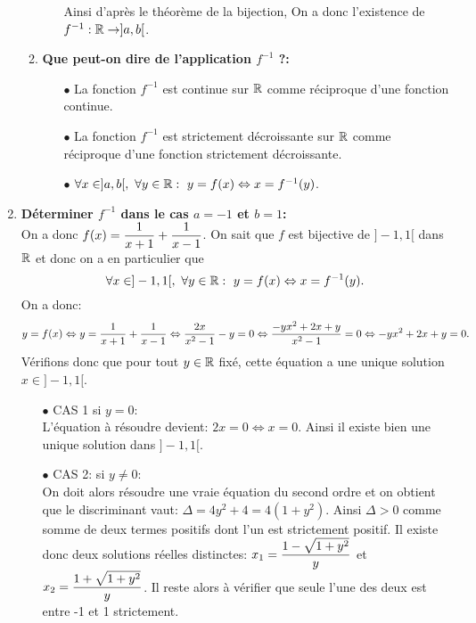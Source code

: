 \documentclass[a4paper, 11pt,reqno]{article}
\begin{document}
\begin{correction}
\begin{enumerate}
\begin{enumerate}
\begin{itemize}
\begin{itemize}
				                  \end{itemize}
				                  Ainsi d'apr\`{e}s le th\'eor\`{e}me de la bijection,  On a donc l'existence de $f^{-1}: \mathbb{R}\rightarrow \rbrack a,b\lbrack$.
			            \end{itemize}
			      \item  \textbf{Que peut-on dire de l'application $f^{-1}$ ?:}
			            \begin{itemize}
				            \item[$\bullet$] La fonction $f^{-1}$ est continue sur $\mathbb{R}$ comme r\'eciproque d'une fonction continue.
				            \item[$\bullet$] La fonction $f^{-1}$ est strictement d\'ecroissante sur $\mathbb{R}$ comme r\'eciproque d'une fonction strictement d\'ecroissante.
				            \item[$\bullet$] $\forall x\in\rbrack a,b\lbrack,\ \forall y\in\mathbb{R}:\ y=f(x)\Leftrightarrow x=f^{-1}(y)$.
			            \end{itemize}
		      \end{enumerate}
		\item \textbf{D\'eterminer $f^{-1}$ dans le cas $a=-1$ et $b=1$:}\\
		      \noindent On a donc $f(x)=\displaystyle\frac{1}{x+1}+\displaystyle\frac{1}{x-1}$. On sait que $f$ est bijective de $\rbrack -1,1\lbrack$ dans $\mathbb{R}$ et donc on a en particulier que
		      $$\forall x\in\rbrack -1,1\lbrack,\ \forall y\in\R:\ y=f(x)\Leftrightarrow x=f^{-1}(y).$$
		      On a donc:
		      $$y=f(x)\Leftrightarrow y=\displaystyle\frac{1}{x+1}+\displaystyle\frac{1}{x-1} \Leftrightarrow \displaystyle\frac{2x}{x^2-1}-y=0\Leftrightarrow \displaystyle\frac{-yx^2+2x+y}{x^2-1}=0\Leftrightarrow -yx^2+2x+y=0.$$
		      V\'erifions donc que pour tout $y\in\mathbb{R}$ fix\'e, cette \'equation a une unique solution $x\in\rbrack -1,1\lbrack$.
		      \begin{itemize}
			      \item[$\bullet$] CAS 1 si $y=0$:\\
			            \noindent L'\'equation \`{a} r\'esoudre devient: $2x=0\Leftrightarrow x=0$. Ainsi il existe bien une unique solution dans $\rbrack -1,1\lbrack$.
			      \item[$\bullet$] CAS 2: si $y\not= 0$:\\
			            \noindent On doit alors r\'esoudre une vraie \'equation du second ordre et on obtient que le discriminant vaut: $\Delta=4y^2+4=4(1+y^2)$. Ainsi $\Delta>0$ comme somme de deux termes positifs dont l'un est strictement positif. Il existe donc deux solutions r\'eelles distinctes: $x_1=\displaystyle\frac{1-\sqrt{1+y^2}}{y}$ et $x_2=\displaystyle\frac{1+\sqrt{1+y^2}}{y}$. Il reste alors \`{a} v\'erifier que seule l'une des deux est entre -1 et 1 strictement.

\end{itemize}
\end{enumerate}
\end{correction}
\end{document}
